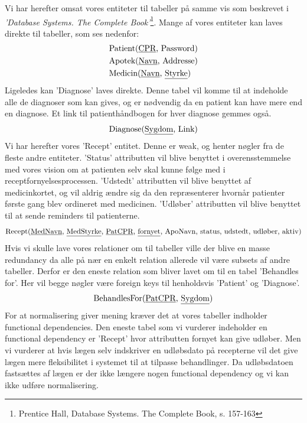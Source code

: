 Vi har herefter omsat vores entiteter til tabeller på samme vis som beskrevet i \textit{'Database Systems. The Complete Book'}\footnote{Prentice Hall, Database Systems. The Complete Book, s. 157-163}. Mange af vores entiteter kan laves direkte til tabeller, som ses nedenfor:
\begin{align*}
	&\textrm{Patient}(\textrm{\underline{CPR}, Password})\\
	&\textrm{Apotek}(\textrm{\underline{Navn}, Addresse})\\
	&\textrm{Medicin}(\textrm{\underline{Navn}, \underline{Styrke}})\\
\end{align*}
Ligeledes kan 'Diagnose' laves direkte. Denne tabel vil komme til at indeholde alle de diagnoser som kan gives, og er nødvendig da en patient kan have mere end en diagnose. Et link til patienthåndbogen for hver diagnose gemmes også.
\begin{equation*}
\textrm{Diagnose}(\textrm{\underline{Sygdom}, Link})
\end{equation*}
Vi har herefter vores 'Recept' entitet. Denne er weak, og henter nøgler fra de fleste andre entiteter. 'Status' attributten vil blive benyttet i overensstemmelse med vores vision om at patienten selv skal kunne følge med i receptfornyelsesprocessen. 'Udstedt' attributten vil blive benyttet af medicinkortet, og vil aldrig ændre sig da den repræsenterer hvornår patienter første gang blev ordineret med medicinen. 'Udløber' attributten vil blive benyttet til at sende reminders til patienterne.
\begin{equation*}
	\textrm{Recept}(\textrm{\underline{MedNavn}, \underline{MedStyrke}, \underline{PatCPR}, \underline{fornyet}, ApoNavn, status, udstedt, udløber, aktiv})
\end{equation*}
Hvis vi skulle lave vores relationer om til tabeller ville der blive en masse redundancy da alle på nær en enkelt relation allerede vil være subsets af andre tabeller. Derfor er den eneste relation som bliver lavet om til en tabel 'Behandles for'. Her vil begge nøgler være foreign keys til henholdsvis 'Patient' og 'Diagnose'.
\begin{equation*}
\textrm{BehandlesFor}(\textrm{\underline{PatCPR}, \underline{Sygdom}})
\end{equation*}
For at normalisering giver mening kræver det at vores tabeller indholder functional dependencies. Den eneste tabel som vi vurderer indeholder en functional dependency er 'Recept' hvor attributten fornyet kan give udløber. Men vi vurderer at hvis lægen selv indskriver en udløbsdato på recepterne vil det give lægen mere fleksibilitet i systemet til at tilpasse behandlinger. Da udløbsdatoen fastsættes af lægen er der ikke længere nogen functional dependency og vi kan ikke udføre normalisering.
